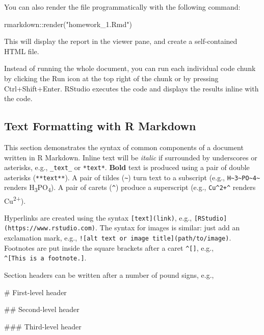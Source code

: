 \documentclass[
]{book}
\newenvironment{Shaded}{\begin{snugshade}}{\end{snugshade}}
\newcommand{\FunctionTok}[1]{\textcolor[rgb]{0.00,0.00,0.00}{#1}}
\newcommand{\NormalTok}[1]{#1}
\newcommand{\SpecialCharTok}[1]{\textcolor[rgb]{0.00,0.00,0.00}{#1}}
\newcommand{\StringTok}[1]{\textcolor[rgb]{0.31,0.60,0.02}{#1}}
\begin{document}
You can also render the file programmatically with the following
command:

\begin{Shaded}
\begin{Highlighting}[]
\NormalTok{rmarkdown}\SpecialCharTok{::}\FunctionTok{render}\NormalTok{(}\StringTok{"homework\_1.Rmd"}\NormalTok{) }
\end{Highlighting}
\end{Shaded}

This will display the report in the viewer pane, and create a
self-contained HTML file.

Instead of running the whole document, you can run each individual code
chunk by clicking the Run icon at the top right of the chunk or by
pressing Ctrl+Shift+Enter. RStudio executes the code and
displays the results inline with the code.

\hypertarget{text-formatting-with-r-markdown}{%
\subsection{Text Formatting with R Markdown}\label{text-formatting-with-r-markdown}}

This section demonstrates the syntax of common components of a document
written in R Markdown. Inline text will be \emph{italic} if surrounded by
underscores or asterisks, e.g., \texttt{\_text\_} or \texttt{*text*}. \textbf{Bold} text is
produced using a pair of double asterisks (\texttt{**text**}). A pair of tildes
(\texttt{\textasciitilde{}}) turn text to a subscript (e.g., \texttt{H\textasciitilde{}3\textasciitilde{}PO\textasciitilde{}4\textasciitilde{}} renders H\textsubscript{3}PO\textsubscript{4}). A
pair of carets (\texttt{\^{}}) produce a superscript (e.g., \texttt{Cu\^{}2+\^{}} renders
Cu\textsuperscript{2+}).

Hyperlinks are created using the syntax \texttt{{[}text{]}(link)}, e.g.,
\texttt{{[}RStudio{]}(https://www.rstudio.com)}. The syntax for images is similar:
just add an exclamation mark, e.g.,
\texttt{!{[}alt\ text\ or\ image\ title{]}(path/to/image)}. Footnotes are put inside
the square brackets after a caret \texttt{\^{}{[}{]}}, e.g., \texttt{\^{}{[}This\ is\ a\ footnote.{]}}.

Section headers can be written after a number of pound signs, e.g.,

\begin{Shaded}
\begin{Highlighting}[]
\FunctionTok{\# First{-}level header}

\FunctionTok{\#\# Second{-}level header}

\FunctionTok{\#\#\# Third{-}level header}
\end{Highlighting}
\end{Shaded}
\end{document}
